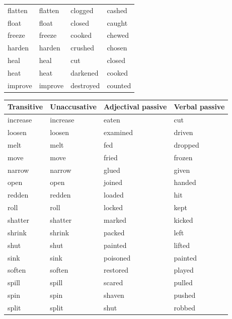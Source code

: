 \documentclass[output=paper]{langsci/langscibook}
\begin{document}
\begin{paperappendix}
\begin{table}[H]
{\begin{tabularx}{\textwidth}{XXXX}
flatten   & flatten   & clogged    & cashed\\
float     & float     & closed     & caught\\
freeze    & freeze    & cooked     & chewed\\
harden    & harden    & crushed    & chosen\\
heal      & heal      & cut        & closed\\
heat      & heat      & darkened   & cooked\\
improve   & improve   & destroyed  & counted\\
\end{tabularx}
}
\end{table}

{\smaller
\begin{tabularx}{\textwidth}{XXXX}
Transitive  & Unaccusative & Adjectival passive & Verbal passive\\
\midrule
increase  & increase  & eaten      & cut\\
loosen    & loosen    & examined   & driven\\
melt      & melt      & fed        & dropped\\
move      & move      & fried      & frozen\\
narrow    & narrow    & glued      & given\\
open      & open      & joined     & handed\\
redden    & redden    & loaded     & hit\\
roll      & roll      & locked     & kept\\
shatter   & shatter   & marked    & kicked\\
shrink    & shrink    & packed    & left\\
shut      & shut      & painted   & lifted\\
sink      & sink      & poisoned  & painted\\
soften    & soften    & restored  & played\\
spill     & spill     & scared    & pulled\\
spin      & spin      & shaven    & pushed\\
split     & split     & shut      & robbed\\

\end{tabularx}}
\end{paperappendix}
\end{document}
